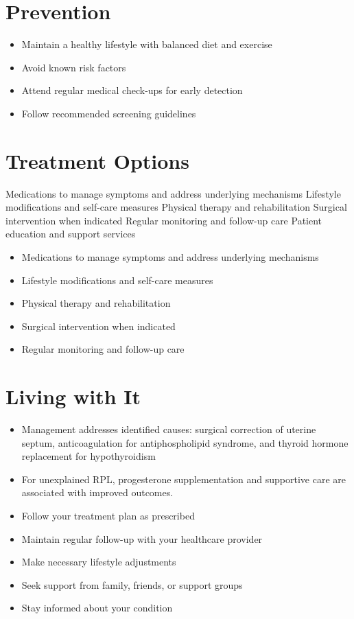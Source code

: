 \section{Prevention}
\begin{itemize}[noitemsep]
  \item Maintain a healthy lifestyle with balanced diet and exercise
  \item Avoid known risk factors
  \item Attend regular medical check-ups for early detection
  \item Follow recommended screening guidelines
\end{itemize}
\section{Treatment Options}
Medications to manage symptoms and address underlying mechanisms Lifestyle modifications and self-care measures Physical therapy and rehabilitation Surgical intervention when indicated Regular monitoring and follow-up care Patient education and support services

\begin{itemize}[noitemsep]
  \item Medications to manage symptoms and address underlying mechanisms
  \item Lifestyle modifications and self-care measures
  \item Physical therapy and rehabilitation
  \item Surgical intervention when indicated
  \item Regular monitoring and follow-up care
\end{itemize}
\section{Living with It}
\begin{itemize}[noitemsep]
  \item Management addresses identified causes: surgical correction of uterine septum, anticoagulation for antiphospholipid syndrome, and thyroid hormone replacement for hypothyroidism
  \item For unexplained RPL, progesterone supplementation and supportive care are associated with improved outcomes.
  \item Follow your treatment plan as prescribed
  \item Maintain regular follow-up with your healthcare provider
  \item Make necessary lifestyle adjustments
  \item Seek support from family, friends, or support groups
  \item Stay informed about your condition
\end{itemize}
